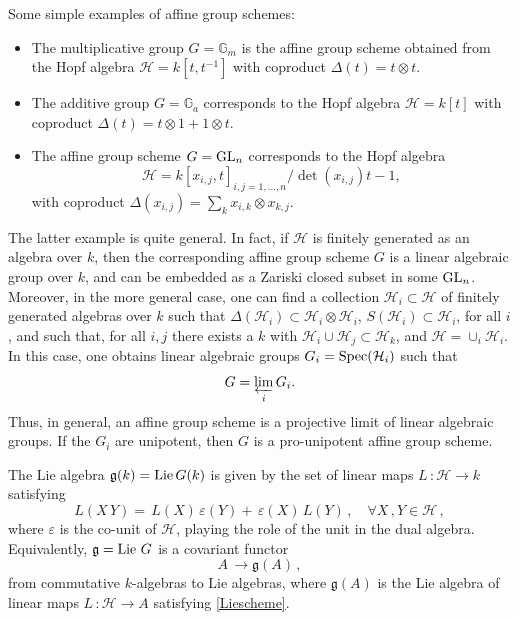\documentclass[10pt]{amsart}
\newcommand{\bG}{\mathbb{G}}
\def\Hc{{\mathcal H}}
\newcommand{\fg}{{\mathfrak{g}}}
\def\ve{\varepsilon}
\def\GL{{\rm GL}}
\def\Lie{{\rm Lie}}
\def\Sp{{\rm Spec}}
\numberwithin{equation}{section}
\begin{document}
\smallskip

Some simple examples of affine group schemes:
\begin{itemize}
\item
The multiplicative group $G=\bG_m$ is the affine group scheme obtained
from the Hopf algebra $\Hc=k[t,t^{-1}]$ with coproduct $\Delta(t)=t\otimes
t$.
\item
The additive group $G=\bG_a$ corresponds to the Hopf algebra
$\Hc=k[t]$ with coproduct $\Delta(t)=t\otimes 1 + 1 \otimes t$.
\item
The affine group scheme $G=\GL_n$ corresponds to the Hopf
algebra $$\Hc=k[x_{i,j},t]_{i,j=1,\ldots,n} / \det(x_{i,j})t-1,$$
with coproduct $\Delta(x_{i,j})= \sum_k x_{i,k}\otimes x_{k,j}$.
\end{itemize}

\smallskip

The latter example is quite general. In fact, if $\Hc$
is finitely generated as an algebra over $k$, then the corresponding
affine group scheme $G$ is a linear algebraic group over $k$, and can
be embedded as a Zariski closed subset in some $\GL_n$.
Moreover, in the more general case, one can find a collection $\Hc_i\subset \Hc$
of finitely generated algebras over $k$ such that
$\Delta(\Hc_i)\subset \Hc_i\otimes \Hc_i$, $S(\Hc_i)\subset \Hc_i$,
for all $i$, and such that, for all $i,j$ there exists a $k$ with
$\Hc_i \cup \Hc_j \subset \Hc_k$, and $\Hc=\cup_i \Hc_i$.
In this case, one obtains linear algebraic groups $G_i=\Sp(\Hc_i)$ such
that
\begin{equation}\label{Gprojlim}
 G=\varprojlim_i G_i.
\end{equation}
Thus, in general, an affine group scheme is a projective limit of
linear algebraic groups. If the $G_i$ are unipotent, then $G$ is a
pro-unipotent affine group scheme.

\smallskip

The Lie algebra $\fg(k)=\Lie\, G(k)$ is given by
the set of linear maps $ L\,:\Hc \to k$ satisfying
\begin{equation}\label{Liescheme}
L(X\,Y)=\, L(X)\,\ve(Y) +\, \ve(X)\, L(Y)\,,\quad \forall X\,,Y
\in \Hc\,,
\end{equation}
where $\ve$ is the co-unit of $\Hc$, playing the role of the unit
in the dual algebra. Equivalently, $\fg=\hbox{Lie} \ G$ is a
covariant functor
\begin{equation}\label{LieGA}
A \,\rightarrow \fg(A)\,,
\end{equation}
from commutative $k$-algebras to Lie algebras, where $\fg(A)$ is the
Lie algebra of linear maps $ L\,:\Hc \to A$ satisfying
\eqref{Liescheme}.
\end{document}
